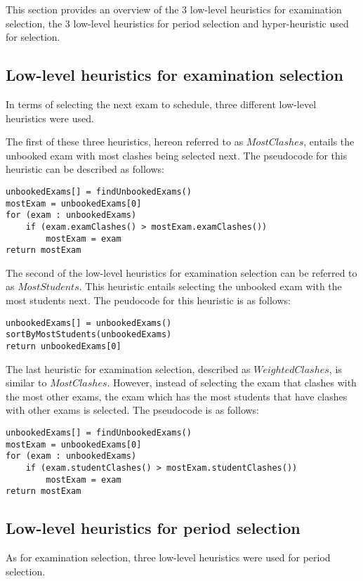 \documentclass[conference]{IEEEtran}
\begin{document}
This section provides an overview of the 3 low-level heuristics for examination selection, the 3 low-level heuristics for period selection and hyper-heuristic used for selection.

\subsection{Low-level heuristics for examination selection}
In terms of selecting the next exam to schedule, three different low-level heuristics were used.

The first of these three heuristics, hereon referred to as \(MostClashes\), entails the unbooked exam with most clashes being selected next. The pseudocode for this heuristic can be described as follows:
\begin{lstlisting}
unbookedExams[] = findUnbookedExams()
mostExam = unbookedExams[0]
for (exam : unbookedExams)
	if (exam.examClashes() > mostExam.examClashes())
		mostExam = exam
return mostExam
\end{lstlisting}

The second of the low-level heuristics for examination selection can be referred to as \(MostStudents\). This heuristic entails selecting the unbooked exam with the most students next. The peudocode for this heuristic is as follows:
\begin{lstlisting}
unbookedExams[] = unbookedExams()
sortByMostStudents(unbookedExams)
return unbookedExams[0]
\end{lstlisting}

The last heuristic for examination selection, described as \(WeightedClashes\), is similar to \(MostClashes\). However, instead of selecting the exam that clashes with the most other exams, the exam which has the most students that have clashes with other exams is selected. The pseudocode is as follows:
\begin{lstlisting}
unbookedExams[] = findUnbookedExams()
mostExam = unbookedExams[0]
for (exam : unbookedExams)
	if (exam.studentClashes() > mostExam.studentClashes())
		mostExam = exam
return mostExam
\end{lstlisting}

\subsection{Low-level heuristics for period selection}
As for examination selection, three low-level heuristics were used for period selection.
\end{document}

